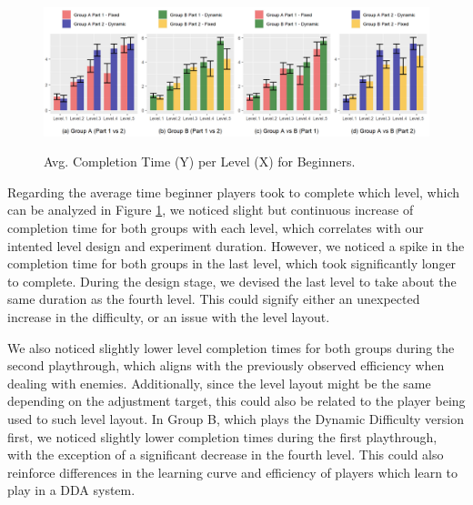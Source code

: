 \begin{figure}[ht]
    \begin{center}
    \caption{Avg. Completion Time (Y) per Level (X) for Beginners.}
        \includegraphics[width=\textwidth]{figures/completion_time-beginner_players.png}
        \label{fig:result-metric-beginners-completion-time}
    \end{center}
\end{figure}

Regarding the average time beginner players took to complete which level, which can be analyzed in Figure \ref{fig:result-metric-beginners-completion-time}, we noticed slight but continuous increase of completion time for both groups with each level, which correlates with our intented level design and experiment duration. However, we noticed a spike in the completion time for both groups in the last level, which took significantly longer to complete. During the design stage, we devised the last level to take about the same duration as the fourth level. This could signify either an unexpected increase in the difficulty, or an issue with the level layout.

We also noticed slightly lower level completion times for both groups during the second playthrough, which aligns with the previously observed efficiency when dealing with enemies. Additionally, since the level layout might be the same depending on the adjustment target, this could also be related to the player being used to such level layout. In Group B, which plays the Dynamic Difficulty version first, we noticed slightly lower completion times during the first playthrough, with the exception of a significant decrease in the fourth level. This could also reinforce differences in the learning curve and efficiency of players which learn to play in a DDA system.

